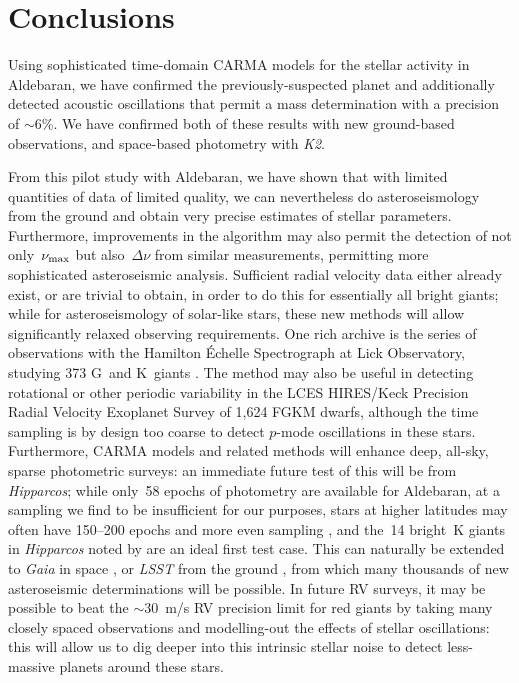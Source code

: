 \documentclass[modern]{aastex61}
\newcommand{\numax}{\mbox{$\nu_{\rm max}$}\xspace}
\newcommand{\Dnu}{\mbox{$\Delta \nu$}\xspace}
\newcommand{\hipparcos}{\emph{Hipparcos}\xspace}
\newcommand{\ktwo}{\emph{K2}\xspace}
\begin{document}
\section{Conclusions}

Using sophisticated time-domain CARMA models for the stellar activity in
Aldebaran, we have confirmed the previously-suspected planet and additionally
detected acoustic oscillations that permit a mass determination with a precision
of $\sim 6\%$. We have confirmed both of these results with new ground-based
observations, and space-based photometry with \ktwo.

From this pilot study with Aldebaran, we have shown that with limited quantities of data of limited quality, we can nevertheless do asteroseismology from the ground and obtain very precise estimates of stellar parameters. Furthermore, improvements in the algorithm may also permit the detection of not only~\numax but also~\Dnu from similar measurements, permitting more sophisticated asteroseismic analysis. Sufficient radial velocity data either already exist, or are trivial to obtain, in order to do this for essentially all bright giants; while for asteroseismology of solar-like stars, these new methods will allow significantly relaxed observing requirements. One rich archive is the series of observations with the Hamilton \'{E}chelle Spectrograph at Lick Observatory, studying 373 G~and K~giants \citep[e.g.][]{frink2001,hekker2006,ortiz2016}. The method may also be useful in detecting rotational or other periodic variability in the LCES HIRES/Keck Precision Radial Velocity Exoplanet Survey \citep{butler17} of 1,624 FGKM dwarfs, although the time sampling is by design too coarse to detect $p$-mode oscillations in these stars. Furthermore, CARMA models and related methods will enhance deep, all-sky, sparse photometric surveys: an immediate future test of this will be from \hipparcos; while only~58 epochs of photometry are available for Aldebaran, at a sampling we find to be insufficient for our purposes, stars at higher latitudes may often have 150--200 epochs and more even sampling \citep{hipparcos_phot}, and the~14 bright~K giants in \hipparcos noted by \citet{bedding2000} are an ideal first test case. This can naturally be extended to \emph{Gaia} in space \citep{gaia}, or \emph{LSST} from the ground \citep{dmt,lsst,lsstbook}, from which many thousands of new asteroseismic determinations will be possible. In future RV surveys, it may be possible to beat the \citet{2005PASJ...57...97S} $\sim 30$~m/s RV precision limit for red giants by taking many closely spaced observations and modelling-out the effects of stellar oscillations: this will allow us to dig deeper into this intrinsic stellar noise to detect less-massive planets around these stars.
\end{document}
